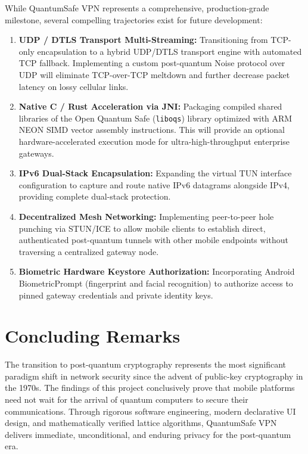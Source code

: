 While QuantumSafe VPN represents a comprehensive, production-grade milestone, several compelling trajectories exist for future development:
\begin{enumerate}
    \item \textbf{UDP / DTLS Transport Multi-Streaming:} Transitioning from TCP-only encapsulation to a hybrid UDP/DTLS transport engine with automated TCP fallback. Implementing a custom post-quantum Noise protocol over UDP will eliminate TCP-over-TCP meltdown and further decrease packet latency on lossy cellular links.
    \item \textbf{Native C / Rust Acceleration via JNI:} Packaging compiled shared libraries of the Open Quantum Safe (\texttt{liboqs}) library optimized with ARM NEON SIMD vector assembly instructions. This will provide an optional hardware-accelerated execution mode for ultra-high-throughput enterprise gateways.
    \item \textbf{IPv6 Dual-Stack Encapsulation:} Expanding the virtual TUN interface configuration to capture and route native IPv6 datagrams alongside IPv4, providing complete dual-stack protection.
    \item \textbf{Decentralized Mesh Networking:} Implementing peer-to-peer hole punching via STUN/ICE to allow mobile clients to establish direct, authenticated post-quantum tunnels with other mobile endpoints without traversing a centralized gateway node.
    \item \textbf{Biometric Hardware Keystore Authorization:} Incorporating Android BiometricPrompt (fingerprint and facial recognition) to authorize access to pinned gateway credentials and private identity keys.
\end{enumerate}

\section{Concluding Remarks}
\label{sec:concluding_remarks}

The transition to post-quantum cryptography represents the most significant paradigm shift in network security since the advent of public-key cryptography in the 1970s. The findings of this project conclusively prove that mobile platforms need not wait for the arrival of quantum computers to secure their communications. Through rigorous software engineering, modern declarative UI design, and mathematically verified lattice algorithms, QuantumSafe VPN delivers immediate, unconditional, and enduring privacy for the post-quantum era.
